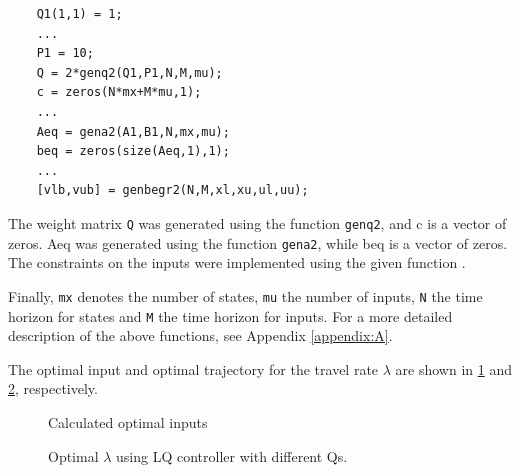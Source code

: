 \begin{lstlisting}
    Q1(1,1) = 1;
    ...
    P1 = 10;
    Q = 2*genq2(Q1,P1,N,M,mu);
    c = zeros(N*mx+M*mu,1);
    ...
    Aeq = gena2(A1,B1,N,mx,mu);
    beq = zeros(size(Aeq,1),1);
    ...
    [vlb,vub] = genbegr2(N,M,xl,xu,ul,uu);
\end{lstlisting}
The weight matrix \texttt{Q} was generated using the function \texttt{genq2}, and c is a vector of zeros. Aeq was generated using the function \texttt{gena2}, while beq is a vector of zeros. The constraints on the inputs were implemented using the given function .

Finally, \texttt{mx} denotes the number of states, \texttt{mu} the number of inputs, \texttt{N} the time horizon for states and \texttt{M} the time horizon for inputs. For a more detailed description of the above functions, see Appendix \ref{appendix:A}.

The optimal input and optimal trajectory for the travel rate $\lambda$ are shown in \cref{fig:optimal_inputs} and \cref{fig:optimal_lambda}, respectively.

\begin{figure}[h]
    \centering
    \caption{Calculated optimal inputs}
    \label{fig:optimal_inputs}
\end{figure}

\begin{figure}[H]
    \centering
    \caption{Optimal $\lambda$ using LQ controller with different Qs.}
    \label{fig:optimal_lambda}
\end{figure}

